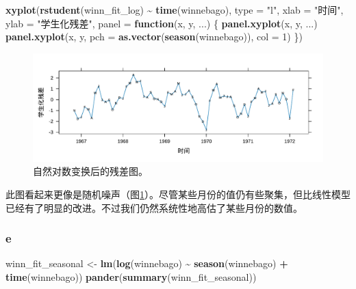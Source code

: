 \documentclass[
]{article}
\newenvironment{Shaded}{\begin{snugshade}}{\end{snugshade}}
\newcommand{\AttributeTok}[1]{\textcolor[rgb]{0.13,0.29,0.53}{#1}}
\newcommand{\ControlFlowTok}[1]{\textcolor[rgb]{0.13,0.29,0.53}{\textbf{#1}}}
\newcommand{\DecValTok}[1]{\textcolor[rgb]{0.00,0.00,0.81}{#1}}
\newcommand{\FunctionTok}[1]{\textcolor[rgb]{0.13,0.29,0.53}{\textbf{#1}}}
\newcommand{\NormalTok}[1]{#1}
\newcommand{\OtherTok}[1]{\textcolor[rgb]{0.56,0.35,0.01}{#1}}
\newcommand{\SpecialCharTok}[1]{\textcolor[rgb]{0.81,0.36,0.00}{\textbf{#1}}}
\newcommand{\StringTok}[1]{\textcolor[rgb]{0.31,0.60,0.02}{#1}}
\begin{document}
\begin{Shaded}
\begin{Highlighting}[]
\FunctionTok{xyplot}\NormalTok{(}\FunctionTok{rstudent}\NormalTok{(winn\_fit\_log) }\SpecialCharTok{\textasciitilde{}} \FunctionTok{time}\NormalTok{(winnebago), }\AttributeTok{type =} \StringTok{"l"}\NormalTok{,}
       \AttributeTok{xlab =} \StringTok{"时间"}\NormalTok{, }\AttributeTok{ylab =} \StringTok{"学生化残差"}\NormalTok{,}
       \AttributeTok{panel =} \ControlFlowTok{function}\NormalTok{(x, y, ...) \{}
         \FunctionTok{panel.xyplot}\NormalTok{(x, y, ...)}
         \FunctionTok{panel.xyplot}\NormalTok{(x, y, }\AttributeTok{pch =} \FunctionTok{as.vector}\NormalTok{(}\FunctionTok{season}\NormalTok{(winnebago)), }\AttributeTok{col =} \DecValTok{1}\NormalTok{)}
\NormalTok{       \})}
\end{Highlighting}
\end{Shaded}

\begin{figure}
\centering
\includegraphics{chapter3_files/figure-latex/winnebago-log-res-1.pdf}
\caption{\label{fig:winnebago-log-res}自然对数变换后的残差图。}
\end{figure}

此图看起来更像是随机噪声（图\ref{fig:winnebago-log-res}）。尽管某些月份的值仍有些聚集，但比线性模型已经有了明显的改进。不过我们仍然系统性地高估了某些月份的数值。

\hypertarget{e-2}{%
\subsubsection*{e}\label{e-2}}

\begin{Shaded}
\begin{Highlighting}[]
\NormalTok{winn\_fit\_seasonal }\OtherTok{\textless{}{-}} \FunctionTok{lm}\NormalTok{(}\FunctionTok{log}\NormalTok{(winnebago) }\SpecialCharTok{\textasciitilde{}} \FunctionTok{season}\NormalTok{(winnebago) }\SpecialCharTok{+} \FunctionTok{time}\NormalTok{(winnebago))}
\FunctionTok{pander}\NormalTok{(}\FunctionTok{summary}\NormalTok{(winn\_fit\_seasonal))}
\end{Highlighting}
\end{Shaded}
\end{document}
